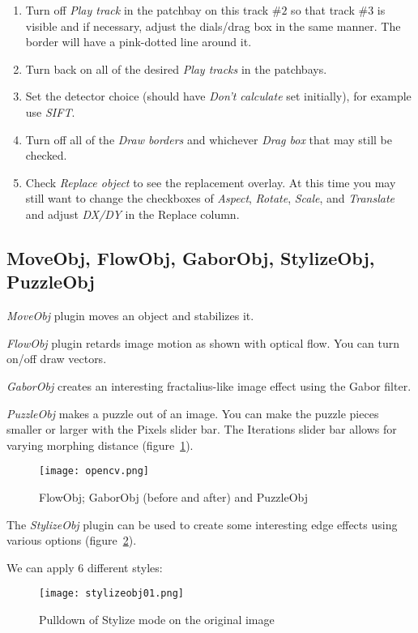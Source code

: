 \begin{enumerate}
    \item Turn off \textit{Play track} in the patchbay on this track $\#2$ so that track $\#3$ is visible and if necessary, adjust the dials/drag box in the same manner. The border will have a pink-dotted line around it.
    \item Turn back on all of the desired \textit{Play tracks} in the patchbays.
    \item Set the detector choice (should have \textit{Don’t calculate} set initially), for example use \textit{SIFT}.
    \item Turn off all of the \textit{Draw borders} and whichever \textit{Drag box} that may still be checked.
    \item Check \textit{Replace object} to see the replacement overlay. At this time you may still want to change the checkboxes of \textit{Aspect}, \textit{Rotate}, \textit{Scale}, and \textit{Translate} and adjust \textit{DX/DY} in the Replace column.
\end{enumerate}

\subsection{MoveObj, FlowObj, GaborObj, StylizeObj, PuzzleObj}%
\label{sub:move_flow_gabor_stylize_puzzle}

\textit{MoveObj} plugin moves an object and stabilizes it.

\textit{FlowObj} plugin retards image motion as shown with optical flow. You can turn on/off draw vectors.

\textit{GaborObj} creates an interesting fractalius-like image effect using the Gabor filter.

\textit{PuzzleObj} makes a puzzle out of an image. You can make the puzzle pieces smaller or larger with the Pixels slider bar. The Iterations slider bar allows for varying morphing distance (figure~\ref{fig:opencv}).

\begin{figure}[htpb]
    \centering
    \texttt{[image: opencv.png]}
    \caption{FlowObj; GaborObj (before and after) and PuzzleObj}
    \label{fig:opencv}
\end{figure}

The \textit{StylizeObj} plugin can be used to create some interesting edge effects using various options (figure~\ref{fig:stylizeobj01}).

We can apply 6 different styles:

\begin{figure}[htpb]
    \centering
    \texttt{[image: stylizeobj01.png]}
    \caption{Pulldown of Stylize mode on the original image}
    \label{fig:stylizeobj01}
\end{figure}

